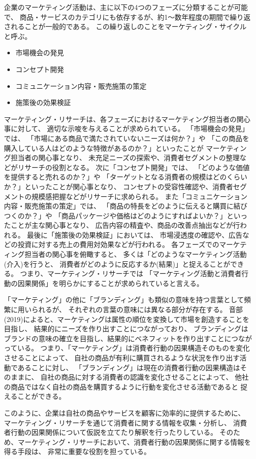 企業のマーケティング活動は、主に以下の4つのフェーズに分類することが可能で、
商品・サービスのカテゴリにも依存するが、約1〜数年程度の期間で繰り返されることが一般的である。
この繰り返しのことをマーケティング・サイクルと呼ぶ。
\begin{itemize}
  \item 市場機会の発見
  \item コンセプト開発
  \item コミュニケーション内容・販売施策の策定
  \item 施策後の効果検証
\end{itemize}
マーケティング・リサーチは、各フェーズにおけるマーケティング担当者の関心事に対して、
適切な示唆を与えることが求められている。
「市場機会の発見」では、
「市場にある商品で満たされていないニーズは何か？」や
「この商品を購入している人はどのような特徴があるのか？」といったことが
マーケティング担当者の関心事となり、
未充足ニーズの探索や、消費者セグメントの整理などがリサーチの役割となる。
次に「コンセプト開発」では、
「どのような価値を提供すると売れるのか？」や
「ターゲットとなる消費者の規模はどのくらいか？」といったことが関心事となり、
コンセプトの受容性確認や、消費者セグメントの規模感把握などがリサーチに求められる。
また「コミュニケーション内容・販売施策の策定」では、
「商品の特長をどのように伝えると購買に結びつくのか？」や
「商品パッケージや価格はどのようにすればよいか？」といったことが主な関心事となり、
広告内容の精査や、商品の改善点抽出などが行われる。
最後に「施策後の効果検証」においては、
市場浸透度の確認や、広告などの投資に対する売上の費用対効果などが行われる。
各フェーズでのマーケティング担当者の関心事を俯瞰すると、
多くは「どのようなマーケティング活動(介入)を行うと、
消費者がどのように反応するか(結果)」と捉えることができる。
つまり、マーケティング・リサーチでは
「マーケティング活動と消費者行動の因果関係」を明らかにすることが求められていると言える。

「マーケティング」の他に「ブランディング」も類似の意味を持つ言葉として頻繁に用いられるが、
それぞれの言葉の意味には異なる部分が存在する。
音部(2019)\cite{2019-eb}によると、マーケティングは属性の順位を変換して市場を創造することを目指し、
結果的にニーズを作り出すことにつながっており、
ブランディングはブランドの意味の確立を目指し、結果的にベネフィットを作り出すことにつながっている。
つまり、「マーケティング」は消費者行動の因果構造そのものを変化させることによって、
自社の商品が有利に購買されるような状況を作り出す活動であることに対し、
「ブランディング」は現在の消費者行動の因果構造はそのままに、
自社の商品に対する消費者の認識を変化させることによって、
他社の商品ではなく自社の商品を購買するように行動を変化させる活動であると
捉えることができる。

このように、企業は自社の商品やサービスを顧客に効率的に提供するために、
マーケティング・リサーチを通じて消費者に関する情報を収集・分析し、
消費者行動の因果関係について仮説を立てたり解釈を行ったりしている。
そのため、マーケティング・リサーチにおいて、消費者行動の因果関係に関する情報を得る手段は、
非常に重要な役割を担っている。

